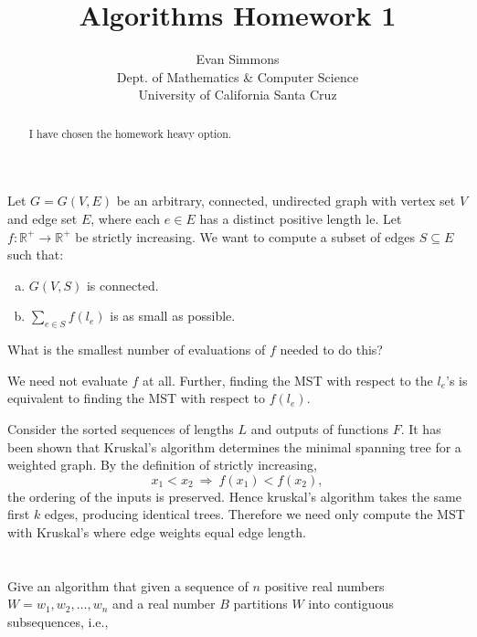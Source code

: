 \documentclass{amsart}
\theoremstyle{definition}
\theoremstyle{remark}
\numberwithin{equation}{section}
\newcommand{\RR}{\mathbb R}
\begin{document}
\title[]{Algorithms Homework 1}%
\author{Evan Simmons \\
        Dept. of Mathematics \& Computer Science \\ University of California Santa Cruz}%
\renewcommand{\abstractname}{Homework Option}
\begin{abstract}
I have chosen the homework heavy option.
\end{abstract}
\maketitle

\section{} Let $G = G(V, E)$ be an arbitrary, connected, undirected graph with
vertex set $V$ and edge set $E$, where each $e \in E$ has a distinct
positive length le. Let $f : \RR^+ \rightarrow \RR^+$ be strictly
increasing. We want to compute a subset of edges $S \subseteq E$ such
that:

\begin{enumerate}[(a)]
  \item $G(V,S)$ is connected.
  \item $\sum_{e \in S} f(l_e)$ is as small as possible.
\end{enumerate}

What is the smallest number of evaluations of $f$ needed to do this?

\claimstar We need not evaluate $f$ at all. Further, finding the MST
with respect to the $l_e$'s is equivalent to finding the MST with
respect to $f(l_e)$.

\proof Consider the sorted sequences of lengths $L$ and outputs of
functions $F$. It has been shown that Kruskal's algorithm determines
the minimal spanning tree for a weighted graph. By the definition of
strictly increasing,
$$ x_1 < x_2\ \Rightarrow\ f(x_1) < f(x_2), $$
the ordering of the inputs is preserved. Hence kruskal's algorithm
takes the same first $k$ edges, producing identical trees. Therefore
we need only compute the MST with Kruskal's where edge weights equal edge
length.

\section{} Give an algorithm that given a sequence of $n$ positive real numbers $W = w_1, w_2,
\ldots, w_n$ and a real number $B$ partitions $W$ into contiguous subsequences, i.e.,
\end{document}
